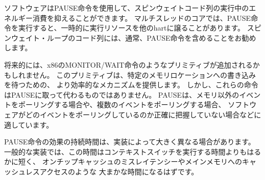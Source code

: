 \begin{commentary}
\begin{comment}
Software can use the PAUSE instruction to reduce energy consumption while
executing spin-wait code sequences.  Multithreaded cores might temporarily
relinquish execution resources to other harts when PAUSE is executed.
It is recommended that a PAUSE instruction generally be included in the code
sequence for a spin-wait loop.
\end{comment}

ソフトウェアはPAUSE命令を使用して、スピンウェイトコード列の実行中のエネルギー消費を抑えることができます。 
マルチスレッドのコアでは、PAUSE命令を実行すると、一時的に実行リソースを他のhartに譲ることがあります。
スピンウェイト・ループのコード列には、通常、PAUSE命令を含めることをお勧めします。

\begin{comment}
A future extension might add primitives similar to the x86 MONITOR/MWAIT
instructions, which provide a more efficient mechanism to wait on writes to
a specific memory location.
However, these instructions would not supplant PAUSE.
PAUSE is more appropriate when polling for non-memory events, when polling for
multiple events, or when software does not know precisely what events it is
polling for.
\end{comment}

将来的には、x86のMONITOR/WAIT命令のようなプリミティブが追加されるかもしれません。
このプリミティブは、特定のメモリロケーションへの書き込みを待つための、
より効率的なメカニズムを提供します。
しかし、これらの命令はPAUSEに取って代わるものではありません。
PAUSEは、メモリ以外のイベントをポーリングする場合や、複数のイベントをポーリングする場合、
ソフトウェアがどのイベントをポーリングしているのか正確に把握していない場合などに適しています。

\begin{comment}
The duration of a PAUSE instruction's effect may vary significantly within and
among implementations.
In typical implementations this duration should be much less than the time to
perform a context switch, probably more on the rough order of an on-chip cache
miss latency or a cacheless access to main memory.
\end{comment}

PAUSE命令の効果の持続時間は、実装によって大きく異なる場合があります。
一般的な実装では、この時間はコンテキストスイッチを実行する時間よりもはるかに短く、
オンチップキャッシュのミスレイテンシーやメインメモリへのキャッシュレスアクセスのような
大まかな時間になるはずです。


\end{commentary}
